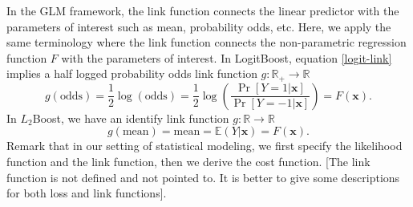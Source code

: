 \documentclass[11pt]{article}
\numberwithin{equation}{section}
\def\R{{\mathbb R}}  %
\def\E{{\mathbb E}}  %
\def\bx{\boldsymbol{x}}
\begin{document}
In the GLM framework, the link function connects the linear predictor with the parameters of interest such as mean, probability odds, etc.
Here, we apply the same terminology where the link function connects the  non-parametric regression function $F$ with the parameters of interest.
In LogitBoost, equation \eqref{logit-link} implies a half logged probability odds link function $g:\R_+\rightarrow\R$ 
$$g(\text{odds})=\frac{1}{2}\log(\text{odds})=\frac{1}{2}\log\left(\frac{\Pr[Y=1|\bx]}{\Pr[Y=-1|\bx]}\right)=F(\bx).$$
In $L_2$Boost, we have an identify link function $g:\R\rightarrow\R$
$$g(\text{mean})=\text{mean}=\E(Y|\bx)=F(\bx).$$
Remark that in our setting of statistical modeling, we first specify the likelihood function and the link function, then we derive the cost function.
{\color{blue}[The link function is not defined and not pointed to. It is better to give some descriptions for both loss and link functions].}


\end{document}
